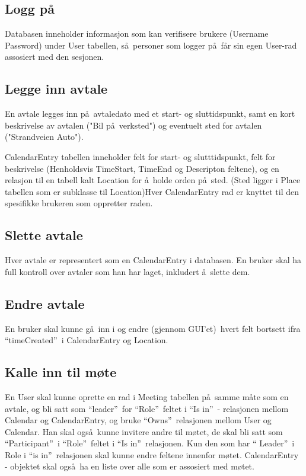 \documentclass{article}
\begin{document}
\subsection{Logg p\aa }

Databasen inneholder informasjon som kan verifisere brukere (Username
Password) under User tabellen, s\aa\ personer som logger p\aa\ f\aa r sin
egen User-rad assosiert med den sesjonen.

\subsection{Legge inn avtale}

En avtale legges inn p\aa\ avtaledato med et start- og sluttidspunkt, samt
en kort beskrivelse av avtalen ("Bil p\aa\ verksted") og eventuelt sted for
avtalen ("Strandveien Auto").

CalendarEntry tabellen inneholder felt for start- og slutttidspunkt, felt
for beskrivelse (Henholdsvis TimeStart, TimeEnd og Descripton feltene), og
en relasjon til en tabell kalt Location for \aa\ holde orden p\aa\ sted.
(Sted ligger i Place tabellen som er subklasse til Location)Hver
CalendarEntry rad er knyttet til den spesifikke brukeren som oppretter raden.

\subsection{Slette avtale}

Hver avtale er representert som en CalendarEntry i databasen. En bruker skal
ha full kontroll over avtaler som han har laget, inkludert \aa\ slette dem.

\subsection{Endre avtale}

En bruker skal kunne g\aa\ inn i og endre (gjennom GUI'et)\ hvert felt
bortsett ifra \textquotedblleft timeCreated\textquotedblright\ i
CalendarEntry og Location.

\subsection{Kalle inn til m\o te}

En User skal kunne oprette en rad i Meeting tabellen p\aa\ samme m\aa te som
en avtale, og bli satt som \textquotedblleft leader\textquotedblright\ for
\textquotedblleft Role\textquotedblright\ feltet i \textquotedblleft Is
in\textquotedblright\ - relasjonen mellom Calendar og CalendarEntry, og
bruke \textquotedblleft Owns\textquotedblright\ relasjonen mellom User og
Calendar. Han skal ogs\aa\ kunne invitere andre til m\o tet, de skal bli
satt som \textquotedblleft Participant\textquotedblright\ i
\textquotedblleft Role\textquotedblright\ feltet i \textquotedblleft Is
in\textquotedblright\ relasjonen. Kun den som har \textquotedblleft
Leader\textquotedblright\ i Role i \textquotedblleft is
in\textquotedblright\ relasjonen skal kunne endre feltene innenfor m\o tet.
CalendarEntry - objektet skal ogs\aa\ ha en liste over alle som er assosiert
med m\o tet.
\end{document}
